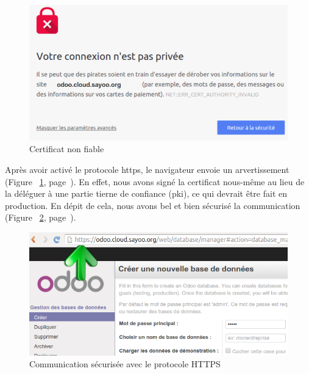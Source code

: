 \begin{onehalfspace}
\begin{figure}[H]
\centering
\includegraphics [scale=0.5]{chapitre4/assets/certificat}
\caption{Certificat non fiable}
\label{fig:certificat}
\end{figure}

Après avoir activé le protocole \acrshort{https}, le navigateur envoie un arvertissement (Figure ~\ref{fig:certificat}, page~\pageref{fig:certificat}). En effet, nous avons signé la certificat nous-même au lieu de la déléguer à une partie tierne de confiance (\acrshort{pki}), ce qui devrait être fait en production. En dépit de cela, nous avons bel et bien sécurisé la communication (Figure ~\ref{fig:https}, page~\pageref{fig:https}).

\begin{figure}[H]
\centering
\includegraphics [scale=0.5]{chapitre4/assets/https}
\caption{Communication sécurisée avec le protocole HTTPS}
\label{fig:https}
\end{figure}



\end{onehalfspace}
